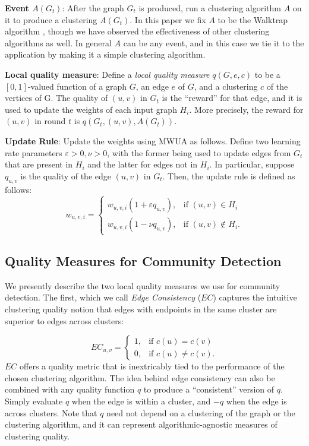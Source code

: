 \documentclass[twoside,twocolumn]{article}
\begin{document}
\textbf{Event $A(G_t)$}: After the graph $G_t$ is produced, run a clustering
algorithm $A$ on it to produce a clustering $A(G_t)$. In this paper we fix $A$
to be the Walktrap algorithm \cite{Walktrap}, though we have observed the
effectiveness of other clustering algorithms as well. In general $A$ can be any
event, and in this case we tie it to the application by making it a simple
clustering algorithm.

\textbf{Local quality measure}: Define a \emph{local quality measure}
$q(G,e,c)$ to be a $[0,1]$-valued function of a graph $G$, an edge $e$ of $G$,
and a clustering $c$ of the vertices of G.  The quality of $(u,v)$ in $G_t$ is
the ``reward'' for that edge, and it is used to update the weights of each
input graph $H_i$.  More precisely, the reward for $(u,v)$ in round $t$ is
$q(G_t, (u,v),A(G_t))$.

\textbf{Update Rule}: Update the weights using MWUA as follows. Define two
learning rate parameters $\varepsilon > 0, \nu > 0$, with the former being used
to update edges from $G_t$ that are present in $H_i$ and the latter for edges
not in $H_i$. In particular, suppose $q_{u,v}$ is the quality of the edge
$(u,v)$ in $G_t$. Then, the update rule is defined as follows:
\[
w_{u,v,i}=
\begin{cases}
w_{u,v,i}(1 +\varepsilon q_{u,v}), & \text{if } (u,v) \in H_i \\
w_{u,v,i}(1 - \nu q_{u,v}), & \text{if } (u,v) \not \in H_i .
\end{cases}
\]
 
 


\subsection{Quality Measures for Community Detection}
\label{sec:quality-measures}
We presently describe the two local quality measures we use for community
detection. The first, which we call {\em Edge Consistency} ($EC$) captures the
intuitive clustering quality notion that edges with endpoints in the same
cluster are superior to edges across clusters:

\[
   EC_{u,v}=
   \begin{cases}
   1, & \text{if  }c(u)=c(v) \\
   0,  & \text{if  }c(u) \neq c(v).
   \end{cases}
\]
$EC$ offers a quality metric that is inextricably tied to the performance of
the chosen clustering algorithm.  The idea behind edge consistency can also be
combined with any quality function $q$ to produce a ``consistent'' version of
$q$. Simply evaluate $q$ when the edge is within a cluster, and $-q$ when the
edge is across clusters. Note that $q$ need not depend on a clustering of the
graph or the clustering algorithm, and it can represent algorithmic-agnostic
measures of clustering quality.
\end{document}
